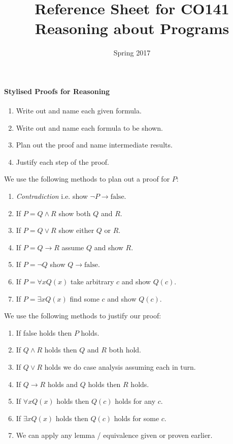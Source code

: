 \documentclass[10pt,twoside,twocolumn]{article}
\begin{document}
\title{Reference Sheet for CO141 Reasoning about Programs}


\date{Spring 2017}

\maketitle

\paragraph{Stylised Proofs for Reasoning}
\begin{enumerate}
\item Write out and name each given formula.
\item Write out and name each formula to be shown.
\item Plan out the proof and name intermediate results.
\item Justify each step of the proof.
\end{enumerate}
We use the following methods to plan out a proof for $P$:
\begin{enumerate}
\item \emph{Contradiction} i.e. show $\lnot P\rightarrow\mbox{false}$.
\item If $P=Q\land R$ show both $Q$ and $R$.
\item If $P=Q\lor R$ show either $Q$ or $R$.
\item If $P=Q\rightarrow R$ assume $Q$ and show $R$.
\item If $P=\lnot Q$ show $Q\rightarrow\mbox{false}$.
\item If $P=\forall xQ\left(x\right)$ take arbitrary $c$ and show $Q\left(c\right)$.
\item If $P=\exists xQ\left(x\right)$ find some $c$ and show $Q\left(c\right)$.
\end{enumerate}
We use the following methods to justify our proof:
\begin{enumerate}
\item If false holds then $P$ holds.
\item If $Q\land R$ holds then $Q$ and $R$ both hold.
\item If $Q\lor R$ holds we do case analysis assuming each in turn.
\item If $Q\rightarrow R$ holds and $Q$ holds then $R$ holds.
\item If $\forall xQ\left(x\right)$ holds then $Q\left(c\right)$ holds
for any $c$.
\item If $\exists xQ\left(x\right)$ holds then $Q\left(c\right)$ holds
for some $c$.
\item We can apply any lemma / equivalence given or proven earlier.
\end{enumerate}
\end{document}
